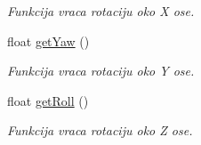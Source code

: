 \begin{DoxyCompactItemize}
\begin{DoxyCompactList}\small\item\em Funkcija vraca rotaciju oko X ose. \end{DoxyCompactList}\item 
float \hyperlink{classentity_1_1Camera_a598fc170be541c2daf281f3b3a267808}{get\+Yaw} ()
\begin{DoxyCompactList}\small\item\em Funkcija vraca rotaciju oko Y ose. \end{DoxyCompactList}\item 
float \hyperlink{classentity_1_1Camera_a9d9288cb98d6bf73c2ac749274ae3f03}{get\+Roll} ()
\begin{DoxyCompactList}\small\item\em Funkcija vraca rotaciju oko Z ose. \end{DoxyCompactList}\end{DoxyCompactItemize}
